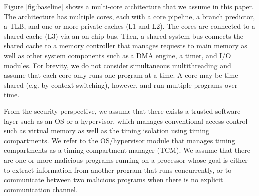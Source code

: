 Figure \ref{fig:baseline} shows a multi-core architecture that we assume
in this paper.
The architecture
has multiple cores, each with a core pipeline, a branch predictor, a TLB,
and one or more private caches (L1 and L2). 
The cores are connected to a shared cache (L3) via an on-chip bus. Then, a shared system 
bus connects the shared cache to a memory controller that manages requests to 
main memory as well as other system components such as a DMA engine, a timer, and I/O
modules.
For brevity, we do not consider simultaneous multithreading and assume that
each core only runs one program at a time.
A core may be time-shared (e.g. by context switching), however, and run multiple
programs over time.




From the security perspective,
we assume that there exists a trusted software layer such as an OS or a 
hypervisor, 
which manages conventional access control such as virtual memory as well as
the timing isolation using timing compartments.
We refer to the OS/hypervisor module that manages timing compartments as
a timing compartment manager (TCM).
We assume that there are one or more malicious programs running on a processor 
whose goal is either to extract information from another program that runs
concurrently, or to communicate between two malicious programs when there is no 
explicit communication channel.

